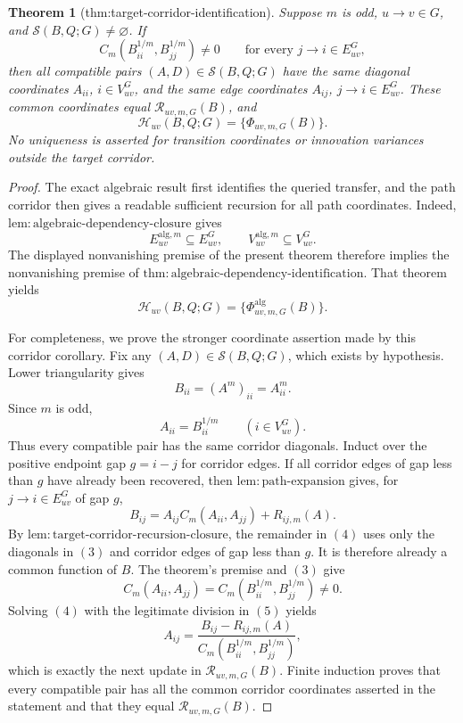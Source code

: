 \documentclass{article}
\newtheorem{theorem}{Theorem}
\begin{document}
\begin{theorem}[thm:target-corridor-identification]\label{thm:target-corridor-identification}
Suppose \(m\) is odd, \(u\to v\in G\), and \(\mathcal S(B,Q;G)\ne\varnothing\).  If
\[
 C_m(B_{ii}^{1/m},B_{jj}^{1/m})\ne0
 \qquad\text{for every }j\to i\in E_{uv}^{G},
\]
then all compatible pairs \((A,D)\in\mathcal S(B,Q;G)\) have the same diagonal coordinates \(A_{ii}\), \(i\in V_{uv}^{G}\), and the same edge coordinates \(A_{ij}\), \(j\to i\in E_{uv}^{G}\).  These common coordinates equal \(\mathscr R_{uv,m,G}(B)\), and
\[
 \mathcal H_{uv}(B,Q;G)=\{\Phi_{uv,m,G}(B)\}.
\]
No uniqueness is asserted for transition coordinates or innovation variances outside the target corridor.
\end{theorem}
\begin{proof}
The exact algebraic result first identifies the queried transfer, and the path corridor then gives a readable sufficient recursion for all path coordinates.  Indeed, \(\mathrm{lem{:}algebraic\mbox{-}dependency\mbox{-}closure}\) gives
\[
 E_{uv}^{\mathrm{alg},m}\subseteq E_{uv}^{G},
 \qquad
 V_{uv}^{\mathrm{alg},m}\subseteq V_{uv}^{G}.
\tag{1}
\]
The displayed nonvanishing premise of the present theorem therefore implies the nonvanishing premise of \(\mathrm{thm{:}algebraic\mbox{-}dependency\mbox{-}identification}\).  That theorem yields
\[
 \mathcal H_{uv}(B,Q;G)
 =\{\Phi^{\mathrm{alg}}_{uv,m,G}(B)\}.
\tag{2}
\]

For completeness, we prove the stronger coordinate assertion made by this corridor corollary.  Fix any
\((A,D)\in\mathcal S(B,Q;G)\), which exists by hypothesis.  Lower triangularity gives
\[
 B_{ii}=(A^m)_{ii}=A_{ii}^m.
\]
Since \(m\) is odd,
\[
 A_{ii}=B_{ii}^{1/m}
 \qquad(i\in V_{uv}^{G}).
\tag{3}
\]
Thus every compatible pair has the same corridor diagonals.  Induct over the positive endpoint gap \(g=i-j\) for corridor edges.  If all corridor edges of gap less than \(g\) have already been recovered, then \(\mathrm{lem{:}path\mbox{-}expansion}\) gives, for \(j\to i\in E_{uv}^{G}\) of gap \(g\),
\[
 B_{ij}=A_{ij}C_m(A_{ii},A_{jj})+R_{ij,m}(A).
\tag{4}
\]
By \(\mathrm{lem{:}target\mbox{-}corridor\mbox{-}recursion\mbox{-}closure}\), the remainder in \((4)\) uses only the diagonals in \((3)\) and corridor edges of gap less than \(g\).  It is therefore already a common function of \(B\).  The theorem's premise and \((3)\) give
\[
 C_m(A_{ii},A_{jj})
 =C_m(B_{ii}^{1/m},B_{jj}^{1/m})\ne0.
\tag{5}
\]
Solving \((4)\) with the legitimate division in \((5)\) yields
\[
 A_{ij}
 =\frac{B_{ij}-R_{ij,m}(A)}
 {C_m(B_{ii}^{1/m},B_{jj}^{1/m})},
\tag{6}
\]
which is exactly the next update in \(\mathscr R_{uv,m,G}(B)\).  Finite induction proves that every compatible pair has all the common corridor coordinates asserted in the statement and that they equal \(\mathscr R_{uv,m,G}(B)\).


\end{proof}
\end{document}
